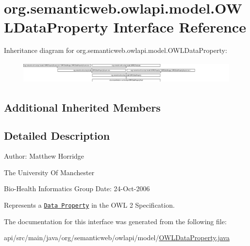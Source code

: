 \hypertarget{interfaceorg_1_1semanticweb_1_1owlapi_1_1model_1_1_o_w_l_data_property}{\section{org.\-semanticweb.\-owlapi.\-model.\-O\-W\-L\-Data\-Property Interface Reference}
\label{interfaceorg_1_1semanticweb_1_1owlapi_1_1model_1_1_o_w_l_data_property}
}
Inheritance diagram for org.\-semanticweb.\-owlapi.\-model.\-O\-W\-L\-Data\-Property\-:\begin{figure}[H]
\begin{center}
\leavevmode
\includegraphics[height=1.183307cm]{interfaceorg_1_1semanticweb_1_1owlapi_1_1model_1_1_o_w_l_data_property}
\end{center}
\end{figure}
\subsection*{Additional Inherited Members}


\subsection{Detailed Description}
Author\-: Matthew Horridge\par
 The University Of Manchester\par
 Bio-\/\-Health Informatics Group Date\-: 24-\/\-Oct-\/2006 

Represents a \href{http://www.w3.org/TR/2009/REC-owl2-syntax-20091027/#Datatypes}{\tt Data Property} in the O\-W\-L 2 Specification. 

The documentation for this interface was generated from the following file\-:\begin{DoxyCompactItemize}
\item 
api/src/main/java/org/semanticweb/owlapi/model/\hyperlink{_o_w_l_data_property_8java}{O\-W\-L\-Data\-Property.\-java}\end{DoxyCompactItemize}
